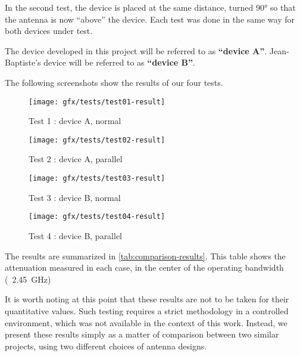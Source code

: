 In the second test, the device is placed at the same distance, turned 90° so
that the antenna is now ``above'' the device. Each test was done in the same way
for both devices under test.

The device developed in this project will be referred to as \textbf{``device A''}.
Jean-Baptiste's device will be referred to as \textbf{``device B''}.


The following screenshots show the results of our four tests.

\begin{figure}[h!]
  \begin{center}
    \texttt{[image: gfx/tests/test01-result]}
  \end{center}
  \caption{Test 1 : device A, normal}
  \label{fig:test01-result}
\end{figure}

\begin{figure}[h!]
  \begin{center}
    \texttt{[image: gfx/tests/test02-result]}
  \end{center}
  \caption{Test 2 : device A, parallel}
  \label{fig:test02-result}
\end{figure}

\begin{figure}[h!]
  \begin{center}
    \texttt{[image: gfx/tests/test03-result]}
  \end{center}
  \caption{Test 3 : device B, normal}
  \label{fig:test03-result}
\end{figure}

\begin{figure}[h!]
  \begin{center}
    \texttt{[image: gfx/tests/test04-result]}
  \end{center}
  \caption{Test 4 : device B, parallel}
  \label{fig:test04-result}
\end{figure}

\pagebreak

The results are summarized in \autoref{tab:comparison-results}. This table shows
the attenuation measured in each case, in the center of the operating bandwidth
(\ie~\SI{2.45}{GHz})

It is worth noting at this point that these results are not to be taken for
their quantitative values. Such testing requires a strict methodology in
a controlled environment, which was not available in the context of this work.
Instead, we present these results simply as a matter of comparison between two
similar projects, using two different choices of antenna designs.

